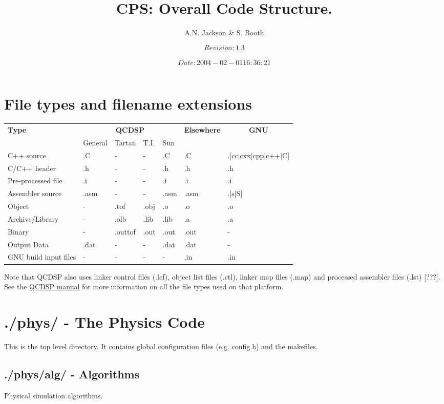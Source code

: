 \documentclass[12pt]{article}
\title{CPS: Overall Code Structure.}
\author{A.N. Jackson \& S. Booth}
\date{\mbox{\small $$Revision: 1.3 $$  $$Date: 2004-02-01 16:36:21 $$}}
\begin{document}
\maketitle

\tableofcontents
\newpage

\section{File types and filename extensions}
\begin{tabular}{|l|llll|l|l|}
\hline
{\bf Type} & \multicolumn{4}{c|}{{\bf QCDSP}} & {\bf Elsewhere} & \multicolumn{1}{c|}{\bf GNU}\\
     & General & Tartan & T.I. & Sun &  & \\
\hline
C++ source & .C & - & - & .C & .C & .[cc$|$cxx$|$cpp$|$c++$|$C] \\
C/C++ header & .h & - & - & .h & .h & .h\\ 
Pre-processed file & .i & - & - & .i & .i & .i\\
Assembler source & .asm & - & - & .asm & .asm & .[s$|$S] \\
Object & - & .tof & .obj & .o & .o & .o \\
Archive/Library & - & .olb & .lib & .lib & .a & .a \\
Binary & - & .outtof & .out & .out & .out & - \\
Output Data & .dat & - & - & .dat & .dat & - \\
GNU build input files & - & - & - & - & .in & .in \\
\hline
\end{tabular}

Note that QCDSP also uses linker control files (.lcf), object list files
(.ctl), linker map files (.map) and processed assembler files (.lst) [???].  
See the \href{../qcdsp/toplevel.html#tth_chAp6}{QCDSP manual}
for more information on all the file types used on that platform.


\section{./phys/ - The Physics Code}
This is the top level directory.  It contains global configuration files (e.g.
config.h) and the makefiles.

\subsection{./phys/alg/ - Algorithms}
\label{phys:alg}
Physical simulation algorithms.
\end{document}
